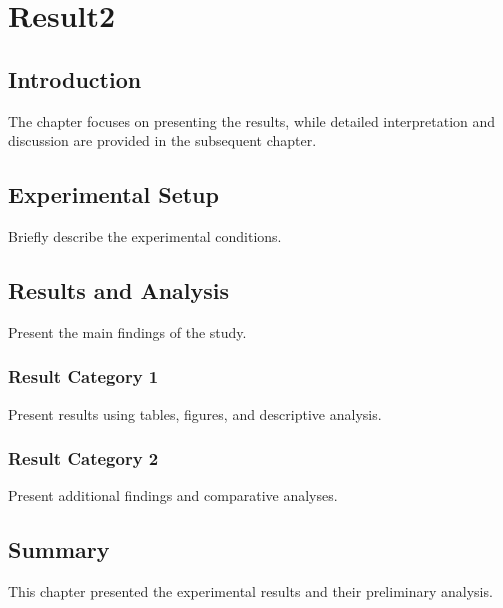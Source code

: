 \chapter{Result2}
\label{chapter:result2}

\section{Introduction}
The chapter focuses on presenting the results, while detailed interpretation and discussion are provided in the subsequent chapter.

\section{Experimental Setup}
Briefly describe the experimental conditions.

\section{Results and Analysis}
Present the main findings of the study. 

\subsection{Result Category 1}
Present results using tables, figures, and descriptive analysis.

\subsection{Result Category 2}
Present additional findings and comparative analyses.

\section{Summary}
This chapter presented the experimental results and their preliminary analysis. 